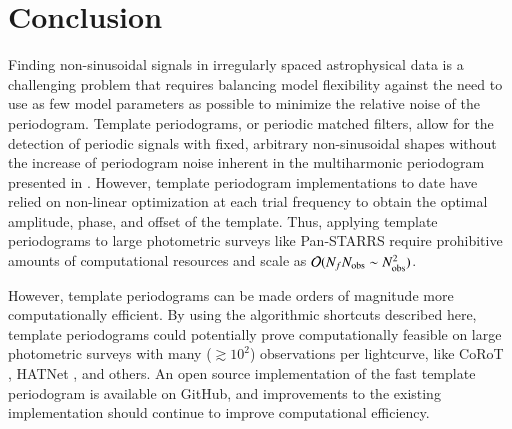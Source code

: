 \documentclass{webofc}
\newcommand{\bigO}{\mathcal{O}}
\begin{document}
\section{Conclusion}\label{sec:conclusion}

Finding non-sinusoidal signals in irregularly spaced astrophysical data is a challenging problem that requires balancing model flexibility
against the need to use as few model parameters as possible to minimize the relative noise of the periodogram. Template periodograms,
or periodic matched filters, allow for the detection of periodic signals with fixed, arbitrary non-sinusoidal shapes without the increase
of periodogram noise inherent in the multiharmonic periodogram presented in \cite{Schwarzenberg-Czerny_1996,Palmer_2009}. However,
template periodogram implementations to date \cite{Sesar_etal_2016,gatspy} have relied on non-linear optimization at each trial frequency
to obtain the optimal amplitude, phase, and offset of the template. Thus, applying template periodograms to large photometric surveys
like Pan-STARRS \cite{PanSTARRS} require prohibitive amounts of computational resources and scale as $\bigO(N_fN_{\rm obs}\sim N_{\rm obs}^2)$.

However, template periodograms can be made orders of magnitude more computationally efficient. By using the algorithmic shortcuts described here,
template periodograms could potentially prove computationally feasible on large photometric surveys with many ($\gtrsim 10^2$) observations per 
lightcurve, like CoRoT \cite{CoRoT}, HATNet \cite{HATNet}, and others. An open source implementation of the fast template periodogram is 
available on GitHub, and improvements to the existing implementation should continue to improve computational efficiency. 



\end{document}
